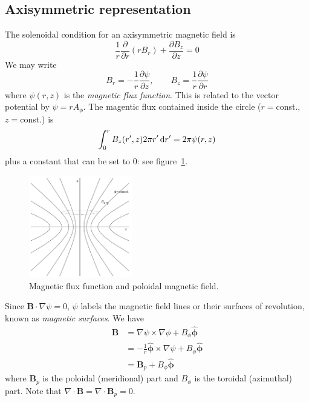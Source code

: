 \documentclass{jknotes}
\newcommand{\B}{\symbf{B}}
\begin{document}
\subsection{Axisymmetric representation}
The solenoidal condition for an axisymmetric magnetic field is
\begin{equation}
	\frac{1}{r}\frac{\partial}{\partial r}\left(rB_r\right) + \frac{\partial
	B_z}{\partial z} = 0
\end{equation}
We may write
\begin{equation}
	B_r = -\frac{1}{r}\frac{\partial \psi}{\partial z}, \hspace{2em} B_z =
	\frac{1}{r}\frac{\partial \psi}{\partial r}
\end{equation}
where $\psi(r,z)$ is the \emph{magnetic flux function}. This is related to the
vector potential by $\psi = r A_\phi$. The magentic flux contained inside the
circle ($r =$const., $z=$const.) is
\begin{equation}
	\int_0^r B_z(r',z)2\pi r' \, \diffd r' = 2\pi \psi(r,z)
\end{equation}
plus a constant that can be set to $0$: see figure~\ref{fig:axisym_B}. 

\begin{figure}[h]
	\centering
	\includegraphics[width=0.4\textwidth]{flux_function.png}
	\caption{Magnetic flux function and poloidal magnetic field.}
	\label{fig:axisym_B}
\end{figure}

Since $\B \cdot \nabla \psi = 0$, $\psi$ labels the magnetic field lines or
their surfaces of revolution, known as \emph{magnetic surfaces}. We have
\begin{align}
	\B &= \nabla \psi \times \nabla \phi + B_\phi \hat{\symbf{\phi}} \\
	   &= -\frac{1}{r} \hat{\symbf{\phi}}\times \nabla \psi + B_\phi
	   \hat{\symbf{\phi}} \\
	   &= \B_p + B_\phi \hat{\symbf{\phi}}
\end{align}
where $\B_p$ is the poloidal (meridional) part and $B_\phi$ is the toroidal
(azimuthal) part. Note that $\nabla \cdot \B = \nabla \cdot \B_p = 0$.
\end{document}
